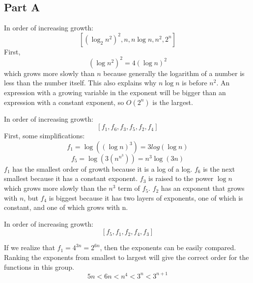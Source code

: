 \documentclass[12pt,twoside]{article}
\begin{document}

\begin{problems}

\section*{Part A}

\problem  %

\begin{problemparts}
\problempart In order of increasing growth: $$[(\log_2n^2)^2, n, n\log n,  n^2, 2^n ]$$
First,
$$(\log n^2)^2 = 4(\log n)^2$$ which grows more slowly than $n$ because generally the logarithm of a number is less than the number itself. This also explains why $n \log n$ is before $n^2$. An expression with a growing variable in the exponent will be bigger than an expression with a constant exponent, so $O(2^n)$ is the largest.

\problempart In order of increasing growth: $$[f_1, f_6, f_3, f_5, f_2, f_4]$$
First, some simplifications:
$$f_1 = \log((\log n)^3) = 3log(\log n)$$
$$f_5 = \log(3(n^{n^3})) = n^3\log(3n)$$
$f_1$ has the smallest order of growth because it is a log of a log. $f_6$ is the next smallest because it has a constant exponent. $f_3$ is raised to the power $\log n$ which grows more slowly than the $n^3$ term of  $f_5$. $f_2$ has an exponent that grows with $n$, but $f_4$ is biggest because it has two layers of exponents, one of which is constant, and one of which grows with n.

\problempart In order of increasing growth: $$[f_5, f_1, f_2, f_4, f_3]$$

If we realize that $f_1 = 4^{3n} = 2^{6n}$, then the exponents can be easily compared. Ranking the exponents from smallest to largest will give the correct order for the functions in this group. $$ 5n < 6n < n^4 < 3^n < 3^{n+1} $$
\end{problemparts}



\problem  %

\begin{problemparts}


\end{problemparts}
\end{problems}
\end{document}
